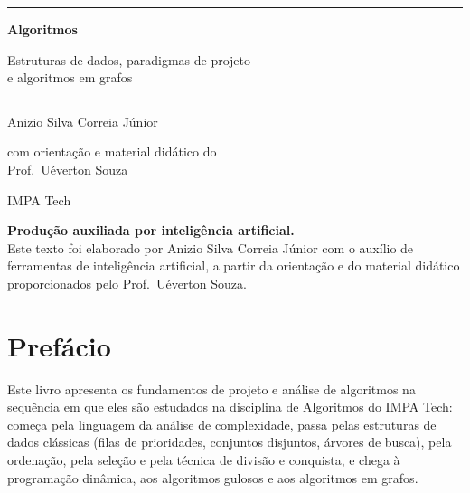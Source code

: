 \documentclass[11pt,a4paper,oneside,openany]{book}
\theoremstyle{plain}
\theoremstyle{definition}
\theoremstyle{remark}
\numberwithin{equation}{chapter}
\begin{document}
\frontmatter
\hypersetup{pageanchor=false}  %
\begin{titlepage}
\centering
\vspace*{2.5cm}
{\color{capcor}\rule{\linewidth}{1.5pt}\par\vspace{16pt}
{\fontsize{40}{46}\selectfont\bfseries Algoritmos\par}
\vspace{12pt}
{\Large Estruturas de dados, paradigmas de projeto\\[2pt] e algoritmos em grafos\par}
\vspace{12pt}\rule{\linewidth}{0.5pt}\par}
\vspace{2cm}
{\LARGE Anizio Silva Correia Júnior\par}
\vspace{14pt}
{\large com orientação e material didático do\\[2pt] Prof.\ Uéverton Souza\par}
\vspace{10pt}
{\normalsize IMPA Tech\par}
\vfill
\begin{tcolorbox}[enhanced, width=0.82\linewidth, colback=capcor!4, colframe=capcor!60, boxrule=0.6pt,
  halign=center, left=8pt, right=8pt, top=6pt, bottom=6pt]
\small\textbf{Produção auxiliada por inteligência artificial.}\\[2pt]
Este texto foi elaborado por Anizio Silva Correia Júnior com o auxílio de ferramentas de inteligência artificial,
a partir da orientação e do material didático proporcionados pelo Prof.\ Uéverton Souza.
\end{tcolorbox}
\vspace{1cm}
\end{titlepage}
\hypersetup{pageanchor=true}

\chapter{Prefácio}
Este livro apresenta os fundamentos de projeto e análise de algoritmos na sequência em que eles são estudados na disciplina de Algoritmos do IMPA Tech: começa pela linguagem da análise de complexidade, passa pelas estruturas de dados clássicas (filas de prioridades, conjuntos disjuntos, árvores de busca), pela ordenação, pela seleção e pela técnica de divisão e conquista, e chega à programação dinâmica, aos algoritmos gulosos e aos algoritmos em grafos.
\end{document}
